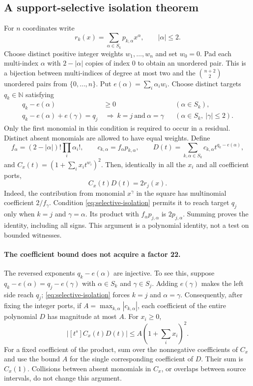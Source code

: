 \subsection{A support-selective isolation theorem}
For $n$ coordinates write
\[
 r_k(x)=\sum_{\alpha\in S_k}p_{k,\alpha}x^\alpha,
 \qquad |\alpha|\leq2.
\]
Choose distinct positive integer weights $w_1,\ldots,w_n$ and set
$w_0=0$.  Pad each multi-index $\alpha$ with $2-|\alpha|$ copies of
index 0 to obtain an unordered pair.  This is a bijection between
multi-indices of degree at most two and the $\binom{n+2}{2}$ unordered
pairs from $\{0,\ldots,n\}$.  Put $e(\alpha)=\sum_i\alpha_iw_i$.
Choose distinct targets $q_k\in\mathbb N$ satisfying
\begin{align}
 q_k-e(\alpha)&\geq0 &&(\alpha\in S_k),\label{eq:selective-nonnegative}\\
 q_k-e(\alpha)+e(\gamma)=q_j
 &\ \Longrightarrow\ k=j\ \text{and}\ \alpha=\gamma
 &&(\alpha\in S_k,\ |\gamma|\leq2).\label{eq:selective-isolation}
\end{align}
Only the first monomial in this condition is required to occur in a
residual.  Distinct absent monomials are allowed to have equal weights.
Define
\[
 f_\alpha=(2-|\alpha|)!\prod_i\alpha_i!,\qquad
 c_{k,\alpha}=f_\alpha p_{k,\alpha},\qquad
 D(t)=\sum_{k,\alpha\in S_k}c_{k,\alpha}t^{q_k-e(\alpha)},
\]
and $C_x(t)=(1+\sum_i x_i t^{w_i})^2$.
Then, identically in all the $x_i$ and all coefficient ports,
\begin{equation}
 [t^{q_j}]C_x(t)D(t)=2r_j(x).\label{eq:selective-extraction}
\end{equation}
Indeed, the contribution from monomial $x^\gamma$ in the square has
multinomial coefficient $2/f_\gamma$.  Condition
\eqref{eq:selective-isolation} permits it to reach target $q_j$ only when
$k=j$ and $\gamma=\alpha$.  Its product with $f_\alpha p_{j,\alpha}$
is $2p_{j,\alpha}$.  Summing proves the identity, including all signs.
This argument is a polynomial identity, not a test on bounded witnesses.

\paragraph{The coefficient bound does not acquire a factor 22.}
The reversed exponents $q_k-e(\alpha)$ are injective.  To see this, suppose
$q_k-e(\alpha)=q_j-e(\gamma)$ with $\alpha\in S_k$ and
$\gamma\in S_j$.  Adding $e(\gamma)$ makes the left side reach $q_j$;
\eqref{eq:selective-isolation} forces $k=j$ and $\alpha=\gamma$.
Consequently, after fixing the integer ports, if
$A=\max_{k,\alpha}|c_{k,\alpha}|$, each coefficient of the entire
polynomial $D$ has magnitude at most $A$.  For $x_i\geq0$,
\begin{equation}
 \bigl|[t^s]C_x(t)D(t)\bigr|
 \leq A\left(1+\sum_i x_i\right)^2.\label{eq:selective-bound}
\end{equation}
For a fixed coefficient of the product, sum over the nonnegative
coefficients of $C_x$ and use the bound $A$ for the single corresponding
coefficient of $D$.  Their sum is $C_x(1)$.  Collisions between absent
monomials in $C_x$, or overlaps between source intervals, do not change
this argument.

